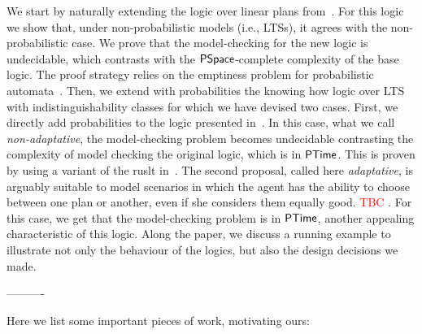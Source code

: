 We start by naturally extending the logic over linear plans from~\cite{Wang15lori,Wang16,Wang2016}.  For this logic we show that, under non-probabilistic models (i.e., LTSs), it agrees with the non-probabilistic case. We prove that the model-checking for the new logic is undecidable,  which contrasts  with the ${\rm\textsf{PSpace}}$-complete complexity of the base logic. The proof strategy relies on the emptiness problem for probabilistic automata~\cite{MadaniHC99}. Then, we extend with probabilities the knowing how logic over LTS with indistinguishability classes for which we have devised two cases.  First, we directly add probabilities to the logic presented in~\cite{AFSVQ21,AFSVQ23}. In this case, what we call \emph{non-adaptative}, the model-checking problem becomes undecidable  contrasting the complexity of model checking the original logic, which is in  ${\rm\textsf{PTime}}$. This is proven by using a variant of the ruslt in~\cite{MadaniHC99}. The second proposal, called here \emph{adaptative}, is arguably suitable to model scenarios in which the agent has the ability to choose between one plan or another, even if she considers them equally good. \textcolor{red}{TBC} . For this case, we get that the model-checking problem is in ${\rm\textsf{PTime}}$, another appealing characteristic of this logic. Along the paper, we discuss a running example to illustrate not only the behaviour of the logics, but also the design decisions we made. 

\iffalse
---------- 

Here we list some important pieces of work, motivating ours:

